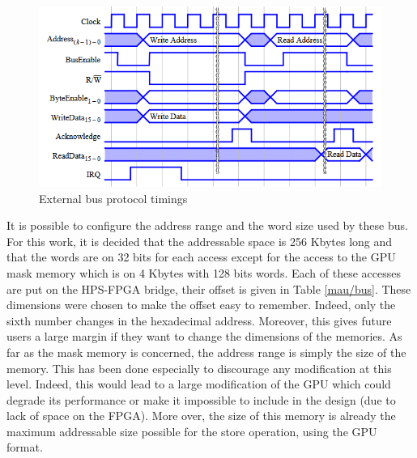 \begin{figure}[ht!]
    \center
    \includegraphics[scale=0.8]{"Chapter5-MAU_CTRLU/res/external_bus_timings.PNG"}
    \caption{External bus protocol timings}
    \label{fig:mau/bus_bridge_protocol}
\end{figure}

It is possible to configure the address range and the word size used by these bus. For this work, 
it is decided that the 
addressable space is 256 Kbytes long and that the words are on 32 bits for each access except for the 
access to the GPU mask memory which is on 4 Kbytes with 128 bits words. Each of these accesses are 
put on the HPS-FPGA bridge, their offset is given in Table \ref{mau/bus}. These dimensions were 
chosen to make the offset easy to remember. Indeed, only the sixth number changes in the 
hexadecimal address. Moreover, this gives future users a large margin if they want to change the 
dimensions of the memories. As far as the mask memory is concerned, the address range is simply the 
size of the memory. This has been done especially to discourage any modification at this level. 
Indeed, this would lead to a large modification of the GPU which could degrade its performance or 
make it impossible to include in the design (due to lack of space on the FPGA). More over, the size
of this memory is already the maximum addressable size possible for the store operation, using the
GPU format.

